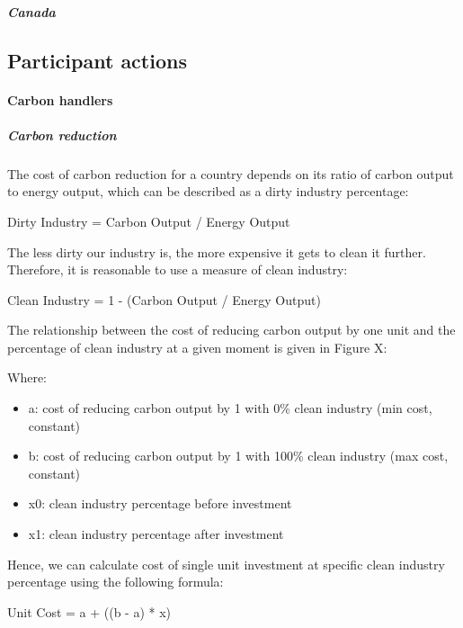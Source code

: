 \subparagraph{Canada}

%
%

\subsection{Participant actions}

\paragraph{Carbon handlers}

\subparagraph{Carbon reduction}

The cost of carbon reduction for a country depends on its ratio of carbon output to energy output, which can be described as a dirty industry percentage:

\begin{center}
Dirty Industry = Carbon Output / Energy Output
\end{center}

The less dirty our industry is, the more expensive it gets to clean it further. Therefore, it is reasonable to use a measure of clean industry:

\begin{center}
Clean Industry = 1 - (Carbon Output / Energy Output)
\end{center}
 
The relationship between the cost of reducing carbon output by one unit and the percentage of 
clean industry at a given moment is given in Figure X:

%
%

Where:
\begin{itemize}
\item a: cost of reducing carbon output by 1 with 0\% clean industry (min cost, constant)
\item b: cost of reducing carbon output by 1 with 100\% clean industry (max cost, constant)
\item x0: clean industry percentage before investment
\item x1: clean industry percentage after investment
\end{itemize}

 
Hence, we can calculate cost of single unit investment at specific clean industry percentage using the following formula:

\begin{center}
Unit Cost = a + ((b - a) * x)
\end{center}

